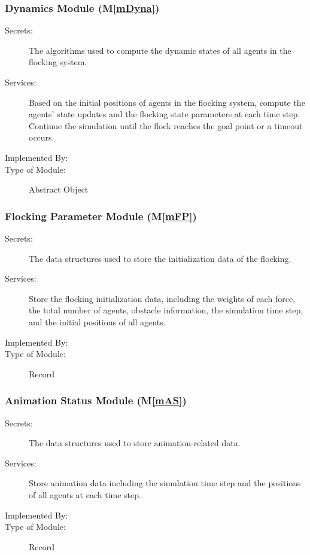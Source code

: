 \documentclass[12pt, titlepage]{article}
\newcommand{\mref}[1]{M\ref{#1}}
\begin{document}
\subsubsection{Dynamics Module (\mref{mDyna})}

\begin{description}
\item[Secrets:] The algorithms used to compute the dynamic states of all 
agents in the flocking system.
\item[Services:] Based on the initial positions of agents in the flocking 
system, compute the agents' state updates and the flocking state parameters 
at each time step. Continue the simulation until the flock reaches the goal 
point or a timeout occurs.
\item[Implemented By:] \progname{}
\item[Type of Module:] Abstract Object
\end{description}

\subsubsection{Flocking Parameter Module (\mref{mFP})}

\begin{description}
\item[Secrets:] The data structures used to store the initialization data of 
the flocking.
\item[Services:] Store the flocking initialization data, including the weights 
of each force, the total number of agents, obstacle information, the simulation 
time step, and the initial positions of all agents.
\item[Implemented By:] \progname{}
\item[Type of Module:] Record
\end{description}

\subsubsection{Animation Status Module (\mref{mAS})}

\begin{description}
\item[Secrets:] The data structures used to store animation-related data.
\item[Services:] Store animation data including the simulation time step and 
the positions of all agents at each time step.
\item[Implemented By:] \progname{}
\item[Type of Module:] Record
\end{description}
\end{document}
